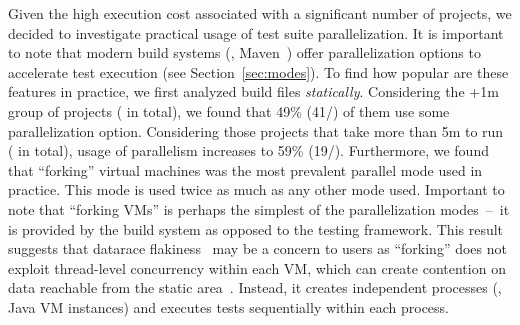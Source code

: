 Given the high execution cost associated with a significant number of
\github{} projects, we decided to investigate practical usage of test
suite parallelization.  It is important to note that modern build
systems (\eg{}, Maven~\cite{maven}) offer parallelization options to
accelerate test execution (see Section~\ref{sec:modes}).  To find how
popular are these features in practice, we first analyzed build files
\emph{statically}.  Considering the +1m group of projects
(\numMedLong{} in total), we found that 49\% (41/\numMedLong{}) of
them use some parallelization option.  Considering those projects that
take more than 5m to run (\numLong{} in total), usage of parallelism
increases to 59\% (19/\numLong{}).  Furthermore, we found that
``forking'' virtual machines was the most prevalent parallel mode used
in practice.  This mode is used twice as much as any other mode used.
Important to note that ``forking VMs'' is perhaps the simplest of the
parallelization modes~--~it is provided by the build system as opposed
to the testing framework.  This result suggests that datarace
flakiness~\cite{luo-etal-fse2014} may be a concern to users as
``forking'' does not exploit thread-level concurrency within each VM,
which can create contention on data reachable from the static
area~\cite{bell-kaiser-icse2014,bell-etal-esecfse2015}.  Instead, it
creates independent processes (\ie{}, Java VM instances) and executes
tests sequentially within each process.  




